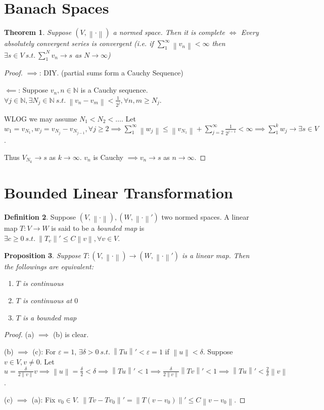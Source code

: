 \documentclass{report}
\newcommand{\N}{\mathbb{N}}
\newcommand{\st}{\ s.t.\ }
\newcommand{\norm}[1]{\left\| #1 \right\|}
\newtheorem{theorem}{Theorem}[chapter]
\newtheorem{proposition}[theorem]{Proposition}
\theoremstyle{definition}
\newtheorem{definition}[theorem]{Definition}
\theoremstyle{remark}
\begin{document}
\section{Banach Spaces}

\begin{theorem}
	Suppose $(V, \norm{\cdot})$ a normed space. Then it is complete $\iff$ Every absolutely convergent series is convergent (i.e. if $\sum_{1}^\infty \norm{v_n} < \infty$ then $\exists s \in V \st \sum_{1}^N v_n \to s$ as $N \to \infty$)
\end{theorem}
\begin{proof}
	$\implies$: DIY. (partial sums form a Cauchy Sequence)

	$\impliedby$: Suppose $v_n, n \in \N$ is a Cauchy sequence. $\forall j \in \N, \exists N_j \in \N \st \norm{v_n - v_m} < \frac{1}{2^j}, \forall n, m \geq N_j$.

	WLOG we may assume $N_1 < N_2 < \ldots$. Let $w_1 = v_{N_1}, w_j = v_{N_j} - v_{N_{j-1}}, \forall j \geq 2 \implies \sum_{1}^\infty \norm{w_j} \leq \norm{v_{N_1}} + \sum_{j=2}^\infty \frac{1}{2^{j-1}} < \infty \implies \sum_{1}^k w_j \to \exists s \in V$.
	
	Thus $V_{N_{k}} \to s$ as $k \to \infty$. $v_n$ is Cauchy $\implies v_n \to s$ as $n \to \infty$.
\end{proof}

\section{Bounded Linear Transformation}
\begin{definition}
	Suppose $(V, \norm{\cdot}), (W, \norm{\cdot}')$ two normed spaces. A linear map $T: V \to W$ is said to be a \emph{bounded map} is $\exists c \geq 0 \st \norm{T_v}' \leq C\norm{v}, \forall v \in V$.
\end{definition}
\begin{proposition}
	Suppose $T: (V, \norm{\cdot}) \to (W, \norm{\cdot}')$ is a linear map. Then the followings are equivalent:
	\begin{enumerate}
		\item $T$ is continuous
		\item $T$ is continuous at $0$
		\item $T$ is a bounded map
	\end{enumerate}
\end{proposition}
\begin{proof}
	(a) $\implies$ (b) is clear.

	(b) $\implies$ (c): For $\varepsilon = 1$, $\exists \delta > 0 \st \norm{Tu}' < \varepsilon = 1$ if $\norm{u} < \delta$. Suppose $v \in V, v \neq 0$. Let $u = \frac{\delta}{2\norm{v}}v \implies \norm{u} = \frac{\delta}{2} < \delta \implies \norm{Tu}' < 1 \implies \frac{\delta}{2\norm{v}}\norm{Tv}' < 1 \implies \norm{Tu}' < \frac{2}{\delta}\norm{v}$.

	(c) $\implies$ (a): Fix $v_0 \in V$. $\norm{Tv - Tv_0}' = \norm{T(v - v_0)}' \leq C\norm{v - v_0}$.
\end{proof}
\end{document}
